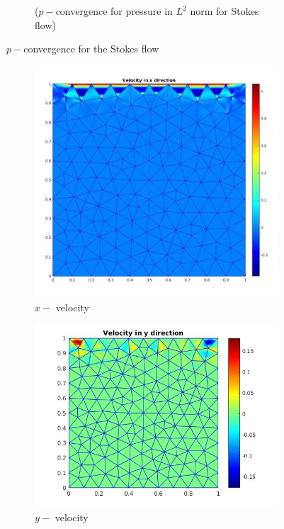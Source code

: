 \documentclass[a4paper,twoside,openright]{book}
\begin{document}
\begin{figure}
\begin{subfigure}{\textwidth}
  \caption{($p-$convergence for pressure in $L^2$ norm for Stokes flow)}
  \label{p_convergence_pressure_l2}
\end{subfigure}
\caption{$p-$convergence for the Stokes flow}
\label{p_conv_stokes_flow}
\end{figure}

\begin{figure}
\begin{subfigure}{\textwidth}	
  \includegraphics[width=0.8\linewidth]{lid_bicgstab_vx.jpg}
  \caption{$x-$ velocity} 
  \label{x_vel_stoke_bicgstab_lid}
\end{subfigure}
\begin{subfigure}{\textwidth}	
  \includegraphics[width=0.8\linewidth]{lid_bicgstab_vy.jpg}
  \caption{$y-$ velocity} 
  \label{y_vel_stoke_bicgstab_lid}
\end{subfigure}
\begin{subfigure}{\textwidth}	

\end{subfigure}
\end{figure}
\end{document}
